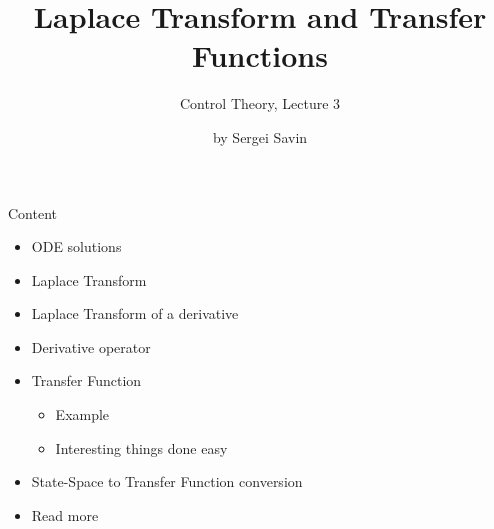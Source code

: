 \documentclass{beamer}
\title{Laplace Transform and Transfer Functions}
\subtitle{Control Theory, Lecture 3}
\author{by Sergei Savin}
\date{\mydate}
\begin{document}
\maketitle


\begin{frame}{Content}

\begin{itemize}
\item ODE solutions
\item Laplace Transform
\item Laplace Transform of a derivative
\item Derivative operator
\item Transfer Function
    \begin{itemize}
    \item Example
    \item Interesting things done easy
    \end{itemize}
\item State-Space to Transfer Function conversion
\item Read more
\end{itemize}

\end{frame}




%
%
%
%
\end{document}

